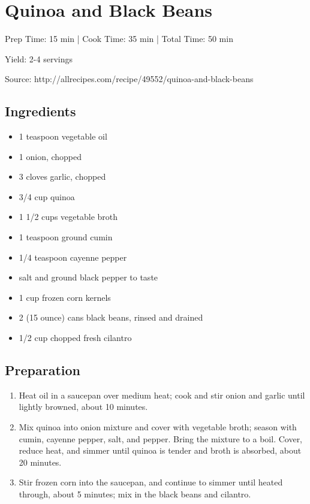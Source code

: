 \section{Quinoa and Black Beans}

\begin{center}
Prep Time: 15 min | 
Cook Time: 35 min | 
Total Time: 50 min

\noindent Yield: 2-4 servings

\vspace{1em}

Source: http://allrecipes.com/recipe/49552/quinoa-and-black-beans
\end{center}

\subsection{Ingredients}
\begin{multicols}{2}
\begin{itemize}
    \item 1 teaspoon vegetable oil
    \item 1 onion, chopped
    \item 3 cloves garlic, chopped
    \item 3/4 cup quinoa
    \item 1 1/2 cups vegetable broth
    \item 1 teaspoon ground cumin
    \item 1/4 teaspoon cayenne pepper
    \item salt and ground black pepper to taste
    \item 1 cup frozen corn kernels
    \item 2 (15 ounce) cans black beans, rinsed and drained
    \item 1/2 cup chopped fresh cilantro
\end{itemize}
\end{multicols}

\subsection{Preparation}
\begin{enumerate}
    \item Heat oil in a saucepan over medium heat; cook and stir onion and garlic until lightly browned, about 10 minutes.
    \item Mix quinoa into onion mixture and cover with vegetable broth; season with cumin, cayenne pepper, salt, and pepper. Bring the mixture to a boil. Cover, reduce heat, and simmer until quinoa is tender and broth is absorbed, about 20 minutes.
    \item Stir frozen corn into the saucepan, and continue to simmer until heated through, about 5 minutes; mix in the black beans and cilantro.
\end{enumerate}
